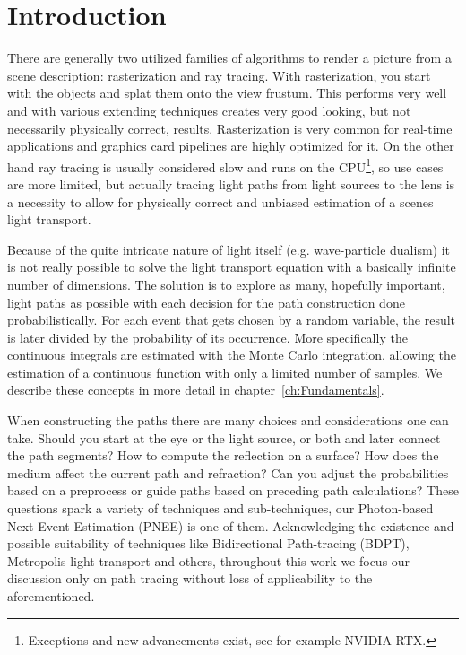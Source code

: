 \chapter{Introduction}
\label{ch:Introduction}

There are generally two utilized families of algorithms to render a picture from a scene description: rasterization and ray tracing. With rasterization, you start with the objects and splat them onto the view frustum. This performs very well and with various extending techniques creates very good looking, but not necessarily physically correct, results.  Rasterization is very common for real-time applications and graphics card pipelines are highly optimized for it. On the other hand ray tracing is usually considered slow and runs on the CPU\footnote{Exceptions and new advancements exist, see for example NVIDIA RTX.}, so use cases are more limited, but actually tracing light paths from light sources to the lens is a necessity to allow for physically correct and unbiased estimation of a scenes light transport.

Because of the quite intricate nature of light itself (e.g. wave-particle dualism) it is not really possible to solve the light transport equation with a basically infinite number of dimensions. The solution is to explore as many, hopefully important, light paths as possible with each decision for the path construction done probabilistically. For each event that gets chosen by a random variable, the result is later divided by the probability of its occurrence. More specifically the continuous integrals are estimated with the Monte Carlo integration, allowing the estimation of a continuous function with only a limited number of samples. We describe these concepts in more detail in chapter~\ref{ch:Fundamentals}.

When constructing the paths there are many choices and considerations one can take. Should you start at the eye or the light source, or both and later connect the path segments? How to compute the reflection on a surface? How does the medium affect the current path and refraction? Can you adjust the probabilities based on a preprocess or guide paths based on preceding path calculations?
These questions spark a variety of techniques and sub-techniques, our Photon-based Next Event Estimation (PNEE) is one of them. Acknowledging the existence and possible suitability of techniques like Bidirectional Path-tracing (BDPT), Metropolis light transport and others, throughout this work we focus our discussion only on path tracing without loss of applicability to the aforementioned.

